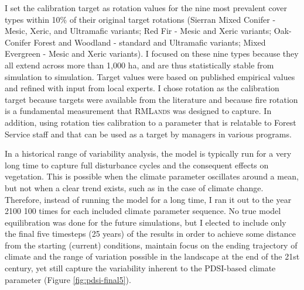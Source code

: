 I set the calibration target as rotation values for the nine most prevalent cover types within 10\% of their original target rotations (Sierran Mixed Conifer - Mesic, Xeric, and Ultramafic variants; Red Fir - Mesic and Xeric variants; Oak-Conifer Forest and Woodland - standard and Ultramafic variants; Mixed Evergreen - Mesic and Xeric variants). I focused on these nine types because they all extend across more than 1,000 ha, and are thus statistically stable from simulation to simulation. Target values were based on published empirical values and refined with input from local experts. I chose rotation as the calibration target because targets were available from the literature and because fire rotation is a fundamental measurement that \textsc{RMLands} was designed to capture. In addition, using rotation ties calibration to a parameter that is relatable to Forest Service staff and that can be used as a target by managers in various programs.

In a historical range of variability analysis, the model is typically run for a very long time to capture full disturbance cycles and the consequent effects on vegetation. This is possible when the climate parameter oscillates around a mean, but not when a clear trend exists, such as in the case of climate change. Therefore, instead of running the model for a long time, I ran it out to the year 2100 100 times for each included climate parameter sequence. No true model equilibration was done for the future simulations, but I elected to include only the final five timesteps (25 years) of the results in order to achieve some distance from the starting (current) conditions, maintain focus on the ending trajectory of climate and the range of variation possible in the landscape at the end of the 21st century, yet still capture the variability inherent to the PDSI-based climate parameter (Figure \ref{fig:pdsi-final5}).





